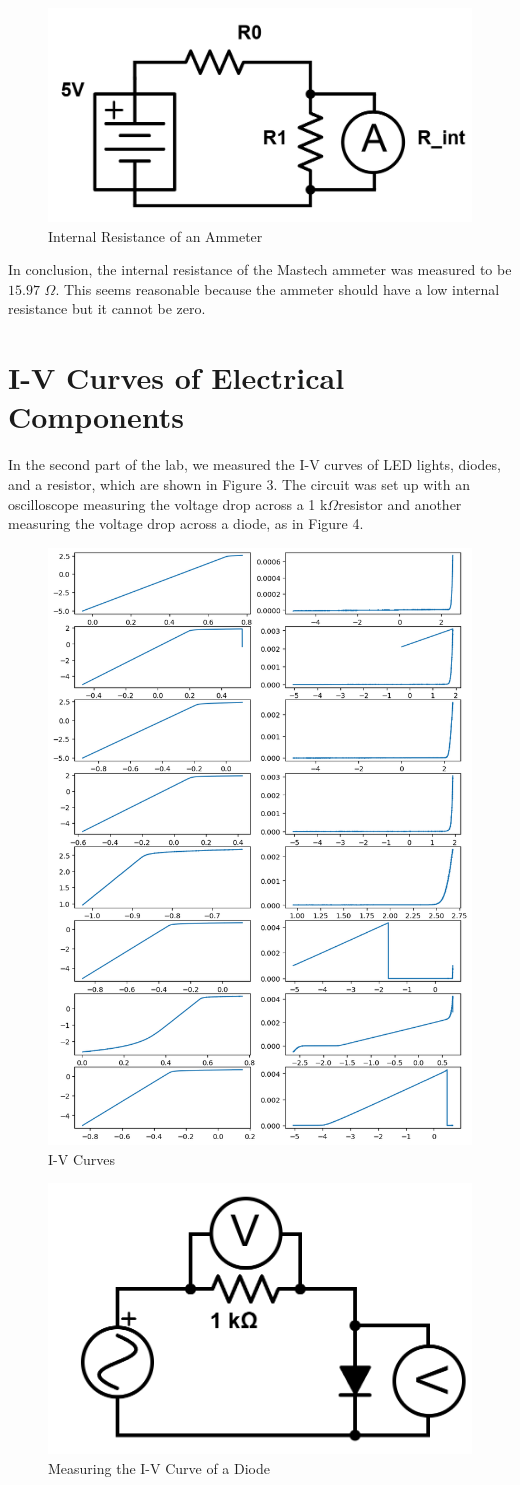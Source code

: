\documentclass{article}
\renewcommand{\O}{\(\Omega\)}
\begin{document}
    \begin{figure}
        \centering
        \includegraphics[width=0.4\linewidth]{am.png}
        \caption{Internal Resistance of an Ammeter}
    \end{figure}
    In conclusion, the internal resistance of the Mastech ammeter was measured to be \(15.97\) \O. This seems reasonable because the ammeter should have a low internal resistance but it cannot be zero.  

    \section{I-V Curves of Electrical Components}
    In the second part of the lab, we measured the I-V curves of LED lights, diodes, and a resistor, which are shown in Figure 3. The circuit was set up with an oscilloscope measuring the voltage drop across a 1 k\O resistor and another measuring the voltage drop across a diode, as in Figure 4. 
    
    \begin{figure}[h!]
        \centering
        \includegraphics[width=0.5\linewidth]{I-V Curves.png}
        \caption{I-V Curves}
    \end{figure}
    \begin{figure}[h!]
        \centering
        \includegraphics[width=0.4\linewidth]{diode_circuit.png}
        \caption{Measuring the I-V Curve of a Diode}
    \end{figure}
\end{document}
